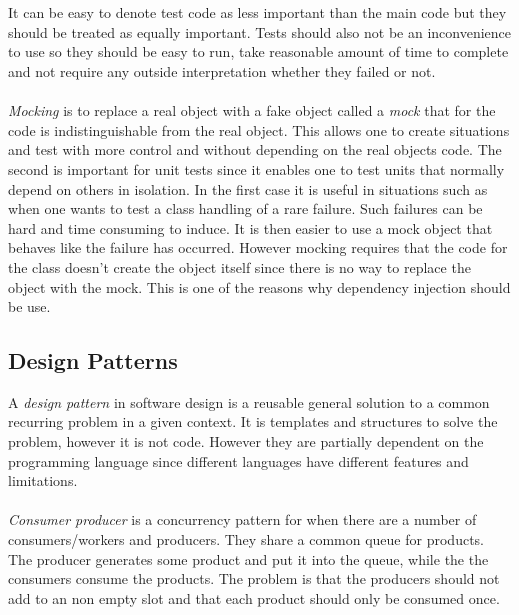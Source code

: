 \documentclass[10pt,a4paper]{report}
\begin{document}
\cite{cleancode2008}\\
\\
It can be easy to denote test code as less important than the main code but they should be treated as equally important. Tests should also not be an inconvenience to use so they should be easy to run, take reasonable amount of time to complete and not require any outside interpretation whether they failed or not.\cite{cleancode2008}\\
\\
\emph{Mocking} is to replace a real object with a fake object called a \emph{mock} that for the code is indistinguishable from the real object. This allows one to create situations and test with more control and without depending on the real objects code. The second is important for unit tests since it enables one to test units that normally depend on others in isolation. In the first case it is useful in situations such as when one wants to test a class handling of a rare failure. Such failures can be hard and time consuming to induce. It is then easier to use a mock object that behaves like the failure has occurred. However mocking requires that the code for the class doesn't create the object itself since there is no way to replace the object with the mock. This is one of the reasons why dependency injection should be use.\cite{cleancode2008}

\subsection{Design Patterns}
\label{design_pattern}
A \emph{design pattern} in software design is a reusable general solution to a common recurring problem in a given context. It is templates and structures to solve the problem, however it is not code. However they are partially dependent on the programming language since different languages have different features and limitations.\cite{design_patterns}\\
\\
\emph{Consumer producer} is a concurrency pattern for when there are a number of consumers/workers and producers. They share a common queue for products. The producer generates some product and put it into the queue, while the the consumers consume the products. The problem is that the producers should not add to an non empty slot and that each product should only be consumed once.\cite{cleancode2008, design_patterns}
\end{document}
